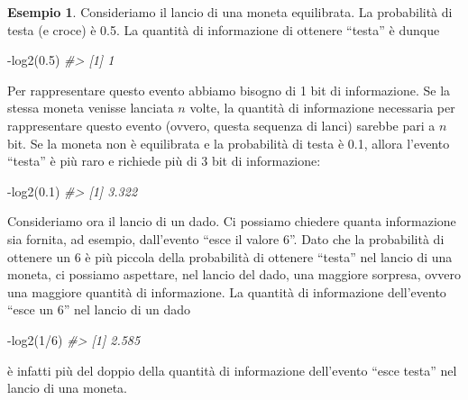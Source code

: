 \documentclass[
  11pt,
]{krantz}
\makeatletter
\newenvironment{Shaded}{\begin{snugshade}}{\end{snugshade}}
\newcommand{\CommentTok}[1]{\textcolor[rgb]{0.37,0.37,0.37}{\textit{#1}}}
\newcommand{\DecValTok}[1]{\textcolor[rgb]{0.06,0.06,0.06}{#1}}
\newcommand{\FloatTok}[1]{\textcolor[rgb]{0.06,0.06,0.06}{#1}}
\newcommand{\FunctionTok}[1]{\textcolor[rgb]{0,0,0}{#1}}
\newcommand{\NormalTok}[1]{#1}
\newcommand{\SpecialCharTok}[1]{\textcolor[rgb]{0,0,0}{#1}}
\newenvironment{kframe}{%
\medskip{}
\setlength{\fboxsep}{.8em}
 \def\at@end@of@kframe{}%
 \ifinner\ifhmode%
  \def\at@end@of@kframe{\end{minipage}}%
  \begin{minipage}{\columnwidth}%
 \fi\fi%
 \def\FrameCommand##1{\hskip\@totalleftmargin \hskip-\fboxsep
 \colorbox{shadecolor}{##1}\hskip-\fboxsep
     \hskip-\linewidth \hskip-\@totalleftmargin \hskip\columnwidth}%
 \MakeFramed {\advance\hsize-\width
   \@totalleftmargin\z@ \linewidth\hsize
   \@setminipage}}%
 {\par\unskip\endMakeFramed%
 \at@end@of@kframe}
\renewenvironment{Shaded}{\begin{kframe}}{\end{kframe}}
\theoremstyle{definition}
\theoremstyle{definition}
\newtheorem{example}{Esempio}[chapter]
\theoremstyle{definition}
\theoremstyle{definition}
\theoremstyle{remark}
\makeatother
\begin{document}
\begin{example}
Consideriamo il lancio di una moneta equilibrata. La probabilità di testa (e croce) è 0.5. La quantità di informazione di ottenere ``testa'' è dunque

\begin{Shaded}
\begin{Highlighting}[]
\SpecialCharTok{{-}}\FunctionTok{log2}\NormalTok{(}\FloatTok{0.5}\NormalTok{)}
\CommentTok{\#\textgreater{} [1] 1}
\end{Highlighting}
\end{Shaded}

Per rappresentare questo evento abbiamo bisogno di 1 bit di informazione. Se la stessa moneta venisse lanciata \(n\) volte, la quantità di informazione necessaria per rappresentare questo evento (ovvero, questa sequenza di lanci) sarebbe pari a \(n\) bit. Se la moneta non è equilibrata e la probabilità di testa è 0.1, allora l'evento ``testa'' è più raro e richiede più di 3 bit di informazione:

\begin{Shaded}
\begin{Highlighting}[]
\SpecialCharTok{{-}}\FunctionTok{log2}\NormalTok{(}\FloatTok{0.1}\NormalTok{)}
\CommentTok{\#\textgreater{} [1] 3.322}
\end{Highlighting}
\end{Shaded}

Consideriamo ora il lancio di un dado. Ci possiamo chiedere quanta informazione sia fornita, ad esempio, dall'evento ``esce il valore 6''. Dato che la probabilità di ottenere un 6 è più piccola della probabilità di ottenere ``testa'' nel lancio di una moneta, ci possiamo aspettare, nel lancio del dado, una maggiore sorpresa, ovvero una maggiore quantità di informazione. La quantità di informazione dell'evento ``esce un 6'' nel lancio di un dado

\begin{Shaded}
\begin{Highlighting}[]
\SpecialCharTok{{-}}\FunctionTok{log2}\NormalTok{(}\DecValTok{1}\SpecialCharTok{/}\DecValTok{6}\NormalTok{)}
\CommentTok{\#\textgreater{} [1] 2.585}
\end{Highlighting}
\end{Shaded}

è infatti più del doppio della quantità di informazione dell'evento ``esce testa'' nel lancio di una moneta.
\end{example}
\end{document}
